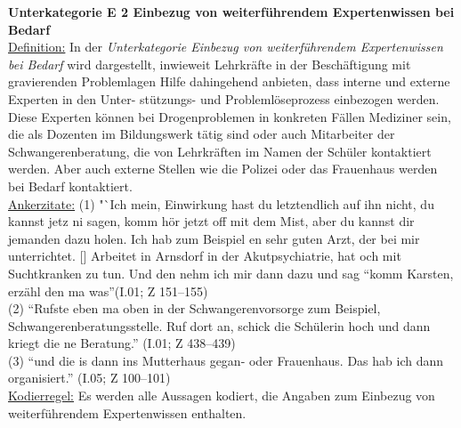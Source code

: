 \textbf{Unterkategorie E 2 Einbezug von weiterführendem Expertenwissen bei Bedarf}\\
\underline{Definition:} In der \textit{Unterkategorie Einbezug von weiterführendem Expertenwissen bei Bedarf} wird dargestellt, inwieweit Lehrkräfte in der Beschäftigung mit gravierenden Problemlagen Hilfe dahingehend anbieten, dass interne und externe Experten in den Unter- stützungs- und Problemlöseprozess einbezogen werden. Diese Experten können bei Drogenproblemen in konkreten Fällen Mediziner sein, die als Dozenten im Bildungswerk tätig sind oder auch Mitarbeiter der Schwangerenberatung, die von Lehrkräften im Namen der Schüler kontaktiert werden. Aber auch externe Stellen wie die Polizei oder das Frauenhaus werden bei Bedarf kontaktiert.\\
\underline{Ankerzitate:} (1) "`Ich mein, Einwirkung hast du letztendlich auf ihn nicht, du kannst jetz ni sagen, komm hör jetzt off mit dem Mist, aber du kannst dir jemanden dazu holen. Ich hab zum Beispiel en sehr guten Arzt, der bei mir unterrichtet. [\punkte] Arbeitet in Arnsdorf in der Akutpsychiatrie, hat och mit Suchtkranken zu tun. Und den nehm ich mir dann dazu und sag "`komm Karsten, erzähl den ma was"'(I.01; Z 151--155)\\ (2) "`Rufste eben ma oben in der Schwangerenvorsorge zum Beispiel, Schwangerenberatungsstelle. Ruf dort an, schick die Schülerin hoch und dann kriegt die ne Beratung."' (I.01; Z 438--439)\\ (3) "`und die is dann ins Mutterhaus gegan- oder Frauenhaus. Das hab ich dann organisiert."' (I.05; Z 100--101)\\
\underline{Kodierregel:} Es werden alle Aussagen kodiert, die Angaben zum Einbezug von weiterführendem Expertenwissen enthalten.\\

